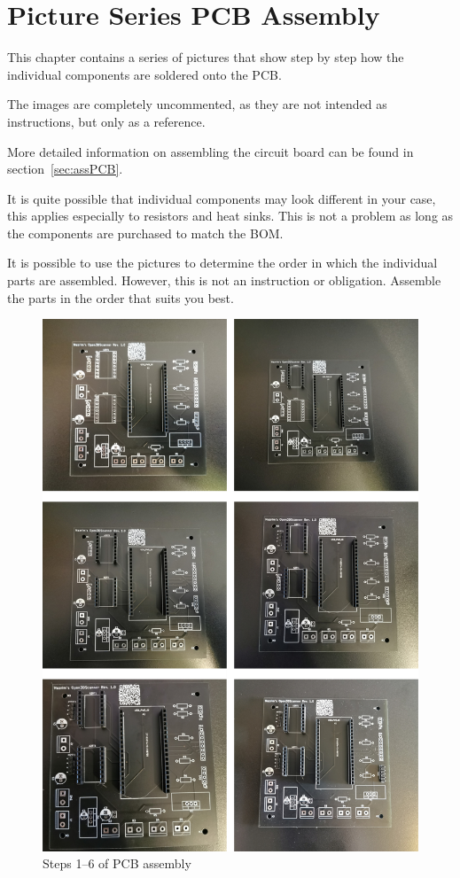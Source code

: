 \chapter{Picture Series PCB Assembly}%
\label{cha:picSerPCB}%

This chapter contains a series of pictures that show step by step how the individual components are soldered onto the PCB.%

The images are completely uncommented, as they are not intended as instructions, but only as a reference.%

More detailed information on assembling the circuit board can be found in section~\ref{sec:assPCB}.%

It is quite possible that individual components may look different in your case, this applies especially to resistors and heat sinks. This is not a problem as long as the components are purchased to match the BOM.%

It is possible to use the pictures to determine the order in which the individual parts are assembled. However, this is not an instruction or obligation. Assemble the parts in the order that suits you best.%

\begin{figure}[ht!]%
	\begin{centered}%
		\includegraphics[width=\linewidth]{images/PcbSeries1.jpg}%
		\caption{Steps \numrange[text-rm=\lightBoldFont]{1}{6} of PCB assembly}%
	\end{centered}%
\end{figure}%

